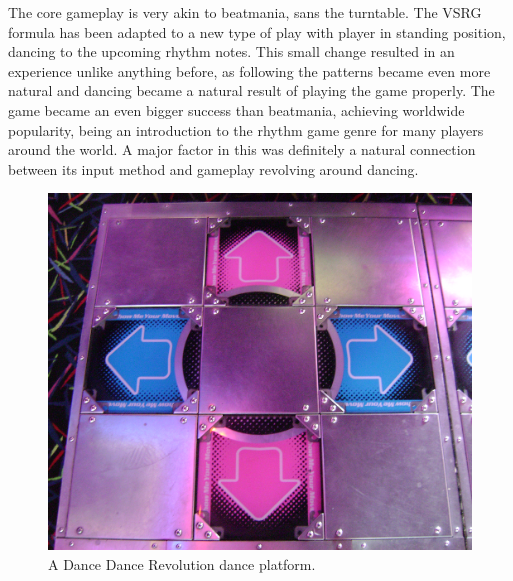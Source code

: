 The core gameplay is very akin to beatmania, sans the turntable. The VSRG formula has been adapted to a new type of play with player in standing position, dancing to the upcoming rhythm notes. This small change resulted in an experience unlike anything before, as following the patterns became even more natural and dancing became a natural result of playing the game properly.  The game became an even bigger success than beatmania, achieving worldwide popularity, being an introduction to the rhythm game genre for many players around the world. A major factor in this was definitely a natural connection between its input method and gameplay revolving around dancing.

\begin{figure}[h]
    \centering\includegraphics[scale=0.25]{obrazki/ddrplatform.png}
    \caption{A Dance Dance Revolution dance platform. \cite{ddrplatform}}
    \label{fig:ddr_platform}
\end{figure}

